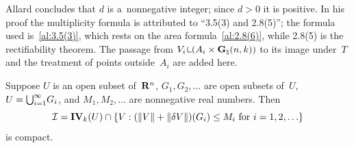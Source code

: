 \begin{remark}
    \label{rem:6.3}
    Allard concludes that $d$ is a~nonnegative integer; since $d > 0$ it is positive. In his
    proof the multiplicity formula is attributed to ``3.5(3) and 2.8(5)''; the formula used
    is~\ref{al:3.5(3)}, which rests on the area formula~\ref{al:2.8(6)}, while 2.8(5) is the
    rectifiability theorem. The passage from $V_i \restrict (A_i \times \pgrass{\adim}{\vdim})$ to
    its image under~$T$ and the treatment of points outside~$A_i$ are added here.
\end{remark}

\begin{theorem}
    \label{al:6.4}
    Suppose $U$ is an open subset of~$\mathbf{R}^{n}$, $G_1, G_2, \ldots$ are open subsets of~$U$, $U
    = {{\textstyle \bigcup}}_{i=1}^\infty G_i$, and $M_1, M_2, \ldots$ are nonnegative real numbers. Then
    \begin{displaymath}
        \mathcal{I} = \mathbf{IV}_{k}(U) \cap \{ V : (\|V\| + \|\delta V\|)(G_i) \le M_i \text{ for
        } i = 1, 2, \ldots \}
    \end{displaymath}
    is compact.
\end{theorem}

